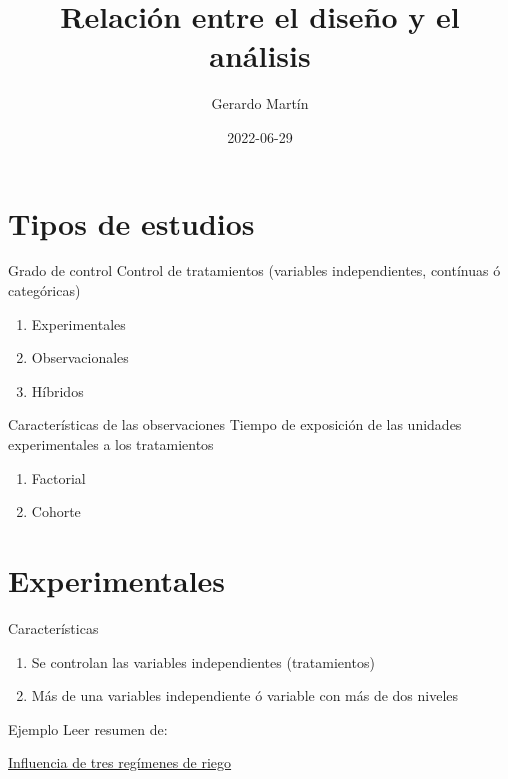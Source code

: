 \documentclass[
  11pt,
  ignorenonframetext,
]{beamer}
\title{Relación entre el diseño y el análisis}
\author{Gerardo Martín}
\date{2022-06-29}
\providecommand{\tightlist}{%
  \setlength{\itemsep}{0pt}\setlength{\parskip}{0pt}}
\begin{document}
\frame{\titlepage}

\hypertarget{tipos-de-estudios}{%
\section{Tipos de estudios}\label{tipos-de-estudios}}

\begin{frame}{Grado de control}
\protect\hypertarget{grado-de-control}{}
Control de tratamientos (variables independientes, contínuas ó
categóricas)

\begin{enumerate}
\tightlist
\item
  Experimentales
\item
  Observacionales
\item
  Híbridos
\end{enumerate}
\end{frame}

\begin{frame}{Características de las observaciones}
\protect\hypertarget{caracteruxedsticas-de-las-observaciones}{}
Tiempo de exposición de las unidades experimentales a los tratamientos

\begin{enumerate}
\tightlist
\item
  Factorial
\item
  Cohorte
\end{enumerate}
\end{frame}

\hypertarget{experimentales}{%
\section{Experimentales}\label{experimentales}}

\begin{frame}{Características}
\protect\hypertarget{caracteruxedsticas}{}
\begin{enumerate}
\tightlist
\item
  Se controlan las variables independientes (tratamientos)
\item
  Más de una variables independiente ó variable con más de dos niveles
\end{enumerate}
\end{frame}

\begin{frame}{Ejemplo}
\protect\hypertarget{ejemplo}{}
Leer resumen de:

\href{https://www.scielo.org.mx/scielo.php?script=sci_arttext\&pid=S0187-57792022000100110\&lang=es}{Influencia
de tres regímenes de riego}
\end{frame}
\end{document}
